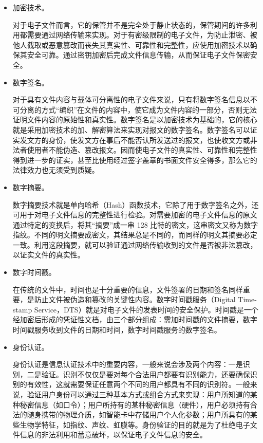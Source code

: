 \begin{enumerate}
        \begin{itemize}
        \item  加密技术。

        对于电子文件而言，它的保管并不是完全处于静止状态的，保管期间的许多利用都需要通过网络传输来实现。对于有密级限制的电子文件，为防止泄密、被他人截取或恶意篡改而丧失其真实性、可靠性和完整性，应使用加密技术以确保其安全可靠。通过密钥加密后完成文件信息传输，从而保证电子文件保密安全。

        \item  数字签名。

        对于具有文件内容与载体可分离性的电子文件来说，只有将数字签名信息以不可分离的方式“编织”在文件的内容中，使它成为文件内容的一部分，否则无法证明文件内容的原始性和真实性。数字签名是以加密技术为基础的，它的核心就是采用加密技术的加、解密算法来实现对报文的数字签名。数字签名可以证实发文方的身份，使发文方在事后不能否认所发送过的报文，也使收文方或非法者使用者不能伪造、篡改报文。因而使电子文件的真实性、可靠性和完整性得到进一步的证实，甚至比使用经过签字盖章的书面文件安全得多，那么它的法律效力也无须受到质疑。

        \item  数字摘要。

        数字摘要技术就是单向哈希（Hash）函数技术，它除了用于数字签名之外，还可用于对电子文件信息的完整性进行检验。对需要加密的电子文件信息的原文通过特定的变换后，将其“摘要”成一串 128 比特的密文，这串密文又称为数字指纹。不同的明文摘要成密文，其结果总是不同的，而同样的明文其摘要必定一致。利用这段摘要，就可以验证通过网络传输收到的文件是否被非法篡改，以证实文件的真实性。

        \item  数字时间戳。

        在传统的文件中，时间也是十分重要的信息，文件签署的日期和签名同样重要，是防止文件被伪造和篡改的关键性内容。数字时间戳服务（Digital Time-stamp Service，DTS）就是对电子文件的发表时间的安全保护。时间戳是一个经加密后形成的凭证性文档，由三个部分组成：需加时间戳的文件摘要，数字时间戳服务收到文件的日期和时间，数字时间戳服务的数字签名。

        \item  身份认证。

        身份认证是信息认证技术中的重要内容，一般来说会涉及两个内容：一是识别，二是验证。识别不仅仅是要对每个合法用户都要有识别能力，还要确保识别的有效性，这就需要保证任意两个不同的用户都具有不同的识别符。一般来说，验证用户身份可以通过三种基本方式或组合方式来实现：用户所知道的某种秘密信息（如口令）；用户所持有的某种秘密信息（硬件），用户必须持有合法的随身携带的物理介质，如智能卡中存储用户个人化参数；用户所具有的某些生物学特征，如指纹、声纹、虹膜等。身份验证的目的就是为了杜绝电子文件信息的非法利用和蓄意破坏，以保证电子文件信息的安全。


\end{itemize}
\end{enumerate}
